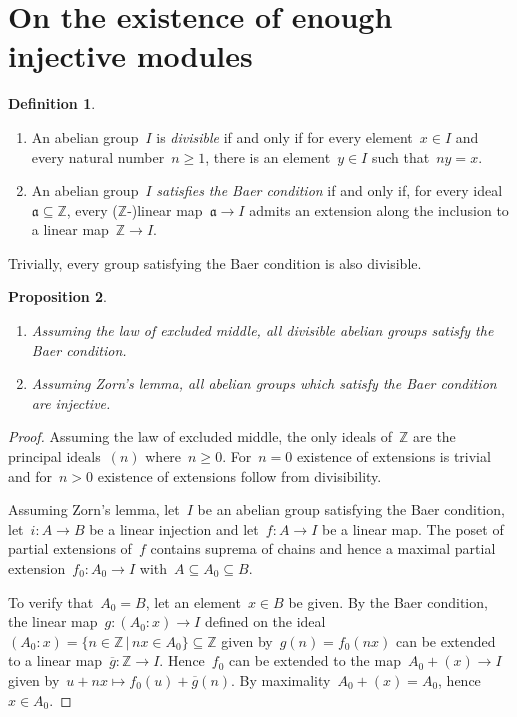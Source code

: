 \documentclass[oneside]{amsart}
\theoremstyle{definition}
\newtheorem{defn}{Definition}[section]
\theoremstyle{plain}
\newtheorem{prop}[defn]{Proposition}
\theoremstyle{remark}
\newcommand{\aaa}{\mathfrak{a}}
\newcommand{\ZZ}{\mathbb{Z}}
\renewcommand{\_}{\mathpunct{.}\,}
\begin{document}
\printbibliography
\enlargethispage{1em}

\appendix

\section{On the existence of enough injective modules}
\label{sect:enough-injective-modules}

\begin{defn}\begin{enumerate}
\item An abelian group~$I$ is \emph{divisible} if and only if for every
element~$x \in I$ and every natural number~$n \geq 1$, there is an element~$y \in I$
such that~$ny = x$.
\item An abelian group~$I$ \emph{satisfies the Baer condition} if and only if,
for every ideal~$\aaa \subseteq \ZZ$, every ($\ZZ$-)linear map~$\aaa \to I$
admits an extension along the inclusion to a linear map~$\ZZ \to I$.
\end{enumerate}
\end{defn}

Trivially, every group satisfying the Baer condition is also divisible.

\begin{prop}
\label{prop:embed1}
\begin{enumerate}
\item Assuming the law of excluded middle, all divisible abelian groups satisfy
the Baer condition.
\item Assuming Zorn's lemma, all abelian groups which satisfy the Baer condition
are injective.
\end{enumerate}
\end{prop}

\begin{proof}Assuming the law of excluded middle, the only ideals of~$\ZZ$ are
the principal ideals~$(n)$ where~$n \geq 0$. For~$n = 0$ existence of
extensions is trivial and for~$n > 0$ existence of extensions follow from
divisibility.

Assuming Zorn's lemma, let~$I$ be an abelian group satisfying the Baer
condition, let~$i : A \to B$ be a linear injection and let~$f : A \to I$ be a
linear map. The poset of partial extensions of~$f$ contains suprema of chains and
hence a maximal partial extension~$f_0 : A_0 \to I$ with~$A \subseteq A_0
\subseteq B$.

To verify that~$A_0 = B$, let an element~$x \in B$ be given.
By the Baer condition, the linear map~$g : (A_0 : x) \to I$ defined on the
ideal~$(A_0 : x) = \{ n \in \ZZ \,|\, nx \in A_0 \} \subseteq \ZZ$ given by~$g(n) =
f_0(nx)$ can be extended to a linear map~$\overline{g} : \ZZ \to I$.
Hence~$f_0$ can be extended to the map~$A_0 + (x) \to I$ given by~$u + nx
\mapsto f_0(u) + \overline{g}(n)$. By maximality~$A_0 + (x) = A_0$, hence~$x \in A_0$.
\end{proof}
\end{document}
